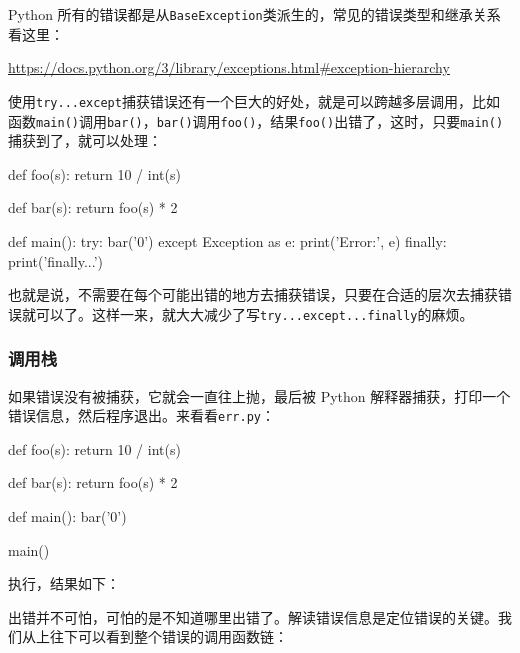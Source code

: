 Python
所有的错误都是从\texttt{BaseException}类派生的，常见的错误类型和继承关系看这里：

\url{https://docs.python.org/3/library/exceptions.html\#exception-hierarchy}

使用\texttt{try...except}捕获错误还有一个巨大的好处，就是可以跨越多层调用，比如函数\texttt{main()}调用\texttt{bar()}，\texttt{bar()}调用\texttt{foo()}，结果\texttt{foo()}出错了，这时，只要\texttt{main()}捕获到了，就可以处理：

\begin{pythoncode}
def foo(s):
    return 10 / int(s)

def bar(s):
    return foo(s) * 2

def main():
    try:
        bar('0')
    except Exception as e:
        print('Error:', e)
    finally:
        print('finally...')
\end{pythoncode}

也就是说，不需要在每个可能出错的地方去捕获错误，只要在合适的层次去捕获错误就可以了。这样一来，就大大减少了写\texttt{try...except...finally}的麻烦。

\hypertarget{ux8c03ux7528ux6808}{%
\subsubsection{调用栈}\label{ux8c03ux7528ux6808}}

如果错误没有被捕获，它就会一直往上抛，最后被 Python
解释器捕获，打印一个错误信息，然后程序退出。来看看\texttt{err.py}：

\begin{pythoncode}
def foo(s):
    return 10 / int(s)

def bar(s):
    return foo(s) * 2

def main():
    bar('0')

main()
\end{pythoncode}

执行，结果如下：


出错并不可怕，可怕的是不知道哪里出错了。解读错误信息是定位错误的关键。我们从上往下可以看到整个错误的调用函数链：


